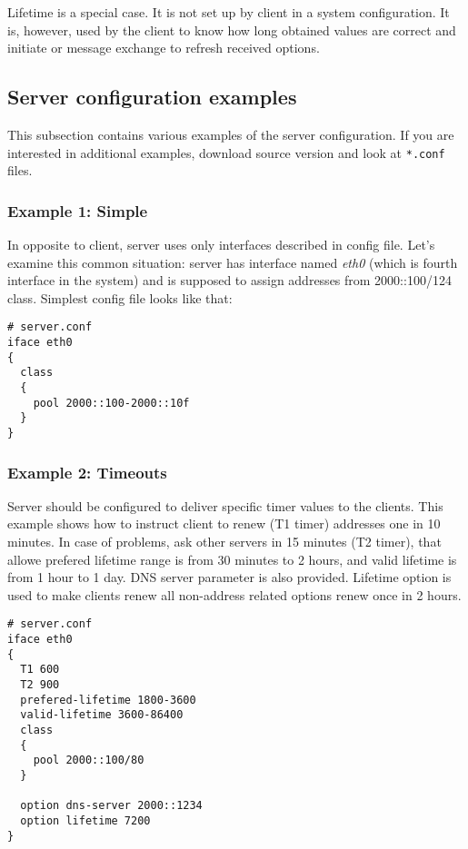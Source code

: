 Lifetime is a special case. It is not set up by client in a system
configuration. It is, however, used by the client to know how long
obtained values are correct and initiate  or
 message exchange to refresh received options.

\subsection{Server configuration examples}

This subsection contains various examples of the server
configuration. If you are interested in additional examples, download
source version and look at \verb+*.conf+ files.

\subsubsection{Example 1: Simple}

In opposite to client, server uses only interfaces described in config
file. Let's examine this common situation: server has interface named
\emph{eth0} (which is fourth interface in the system) and is supposed
to assign addresses from 2000::100/124 class. Simplest config file
looks like that:

\begin{lstlisting}
# server.conf
iface eth0
{
  class
  {
    pool 2000::100-2000::10f
  }
}
\end{lstlisting}

\subsubsection{Example 2: Timeouts}
Server should be configured to deliver specific timer values to the
clients. This example shows how to instruct client to renew (T1 timer)
addresses one in 10 minutes. In case of problems, ask other servers in
15 minutes (T2 timer), that allowe prefered lifetime range is from 30
minutes to 2 hours, and valid lifetime is from 1 hour to 1 day. DNS
server parameter is also provided. Lifetime option is used to make
clients renew all non-address related options renew once in 2 hours.

\begin{lstlisting}
# server.conf
iface eth0
{
  T1 600
  T2 900
  prefered-lifetime 1800-3600
  valid-lifetime 3600-86400
  class
  {
    pool 2000::100/80
  }

  option dns-server 2000::1234
  option lifetime 7200
}
\end{lstlisting}


